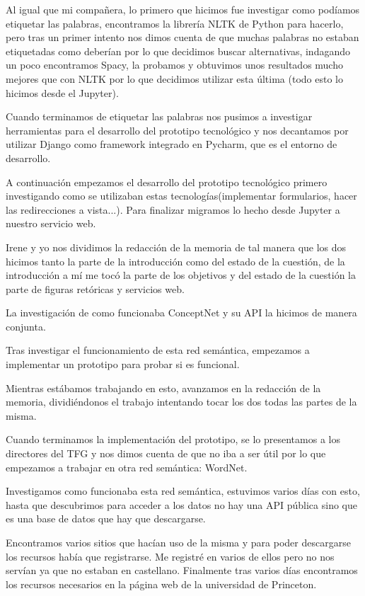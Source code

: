Al igual que mi compañera, lo primero que hicimos fue investigar como podíamos etiquetar las palabras, encontramos la librería NLTK de Python para hacerlo, pero tras un primer intento nos dimos cuenta de que muchas palabras no estaban etiquetadas como deberían por lo que decidimos buscar alternativas, indagando un poco encontramos Spacy, la probamos y obtuvimos unos resultados mucho mejores que con NLTK por lo que decidimos utilizar esta última (todo esto lo hicimos desde el Jupyter). 

Cuando terminamos de etiquetar las palabras nos pusimos a investigar herramientas para el desarrollo del prototipo tecnológico y nos decantamos por utilizar Django como framework integrado en Pycharm, que es el entorno de desarrollo.

A continuación empezamos el desarrollo del prototipo tecnológico primero investigando como se utilizaban estas tecnologías(implementar formularios, hacer las redirecciones a vista...). Para finalizar migramos lo hecho desde Jupyter a nuestro servicio web.

Irene y yo nos dividimos la redacción de la memoria de tal manera que los dos hicimos tanto la parte de la introducción como del estado de la cuestión, de la introducción a mí me tocó la parte de los objetivos y del estado de la cuestión la parte de figuras retóricas y servicios web.

La investigación de como funcionaba ConceptNet y su API la hicimos de manera conjunta.

Tras investigar el funcionamiento de esta red semántica, empezamos a implementar un prototipo para probar si es funcional.

Mientras estábamos trabajando en esto, avanzamos en la redacción de la memoria, dividiéndonos el trabajo intentando tocar los dos todas las partes de la misma.

Cuando terminamos la implementación del prototipo, se lo presentamos a los directores del TFG y nos dimos cuenta de que no iba a ser útil por lo que empezamos a trabajar en otra red semántica: WordNet.

Investigamos como funcionaba esta red semántica, estuvimos varios días con esto, hasta que descubrimos para acceder a los datos no hay una API pública sino que es una base de datos que hay que descargarse.

Encontramos varios sitios que hacían uso de la misma y para poder descargarse los recursos había que registrarse. Me registré en varios de ellos pero no nos servían ya que no estaban en castellano. Finalmente tras varios días encontramos los recursos necesarios en la página web de la universidad de Princeton.

